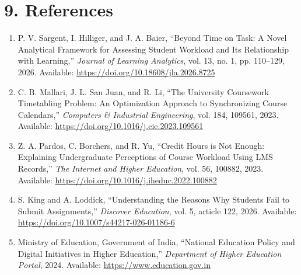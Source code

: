 \documentclass[11pt,a4paper]{article}
\begin{document}

\section*{9. References}

\begin{enumerate}

\item P. V. Sargent, I. Hilliger, and J. A. Baier,
``Beyond Time on Task: A Novel Analytical Framework for Assessing Student Workload and Its Relationship with Learning,''
\textit{Journal of Learning Analytics}, vol. 13, no. 1, pp. 110--129, 2026.
Available:
\url{https://doi.org/10.18608/jla.2026.8725}

\item C. B. Mallari, J. L. San Juan, and R. Li,
``The University Coursework Timetabling Problem: An Optimization Approach to Synchronizing Course Calendars,''
\textit{Computers \& Industrial Engineering}, vol. 184, 109561, 2023.
Available:
\url{https://doi.org/10.1016/j.cie.2023.109561}

\item Z. A. Pardos, C. Borchers, and R. Yu,
``Credit Hours is Not Enough: Explaining Undergraduate Perceptions of Course Workload Using LMS Records,''
\textit{The Internet and Higher Education}, vol. 56, 100882, 2023.
Available:
\url{https://doi.org/10.1016/j.iheduc.2022.100882}

\item S. King and A. Loddick,
``Understanding the Reasons Why Students Fail to Submit Assignments,''
\textit{Discover Education}, vol. 5, article 122, 2026.
Available:
\url{https://doi.org/10.1007/s44217-026-01186-6}

\item Ministry of Education, Government of India,
``National Education Policy and Digital Initiatives in Higher Education,''
\textit{Department of Higher Education Portal}, 2024.
Available:
\url{https://www.education.gov.in}

\end{enumerate}
\end{document}
